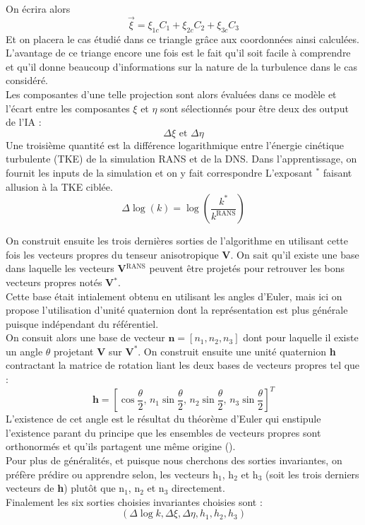 \documentclass[a4paper,12pt]{report}
\newcommand{\bepar}[1]{
	\left( #1 \right)  
}
\newcommand{\becro}[1]{
	\left[ #1 \right]  
}
\numberwithin{equation}{section} %
\begin{document}
On écrira alors $$\vec{\xi} = \xi_{1c}C_1 + \xi_{2c}C_2 + \xi_{3c}C_3$$
Et on placera le cas étudié dans ce triangle grâce aux coordonnées ainsi calculées. L'avantage de ce triange encore une fois est le fait qu'il soit facile à comprendre et qu'il donne beaucoup d'informations sur la nature de la turbulence dans le cas considéré.\\
Les composantes d'une telle projection sont alors évaluées dans ce modèle et l'écart entre les composantes $\xi$ et $\eta$ sont sélectionnés pour être deux des output de l'IA : $$\Delta \xi\text{ et }\Delta \eta$$
  Une troisième quantité est la différence logarithmique entre l'énergie cinétique turbulente (TKE) de la simulation RANS et de la DNS. Dans l'apprentissage, on fournit les inputs de la simulation et on y fait correspondre L'exposant $^*$ faisant allusion à la TKE ciblée. $$\Delta \log(k) = \log\bepar{\frac{k^*}{k^{\text{RANS}}}}$$ 
  
\noindent On construit ensuite les trois dernières sorties de l'algorithme en utilisant cette fois les vecteurs propres du tenseur anisotropique \textbf{V}. On sait qu'il existe une base dans laquelle les vecteurs \textbf{V}$^{\text{RANS}}$ peuvent être projetés pour retrouver les bons vecteurs propres notés \textbf{V}$^*$.\\
Cette base était intialement obtenu en utilisant les angles d'Euler, mais ici on propose l'utilisation d'unité quaternion  dont la représentation est plus générale puisque indépendant du référentiel.\\
On consuit alors une base de vecteur $\textbf{n} = \becro{n_1,n_2,n_3}$ dont pour laquelle il existe un angle $\theta$ projetant $\textbf{V}$ sur $\textbf{V}^*$. On construit ensuite une unité quaternion \textbf{h} contractant la matrice de rotation liant les deux bases de vecteurs propres tel que :
\begin{equation*}
 \textbf{h} = \becro{\cos \frac{\theta}{2},\, n_1\sin\frac{\theta}{2}, \, n_2\sin\frac{\theta}{2}, \, n_3\sin\frac{\theta}{2}}^T  
\end{equation*}   
L'existence de cet angle est le résultat du théorème d'Euler qui enstipule l'existence parant du principe que les ensembles de vecteurs propres sont orthonormés et qu'ils partagent une même origine (\cite{wang2017physics}).\\
Pour plus de généralités, et puisque nous cherchons des sorties invariantes, on préfère prédire ou apprendre selon, les vecteurs h$_1$, h$_2$ et h$_3$ (soit les trois derniers vecteurs de \textbf{h}) plutôt que n$_1$, n$_2$ et n$_3$ directement.\\
Finalement les six sorties choisies invariantes choisies sont :
\begin{equation*}
\bepar{\Delta \log k, \Delta \xi, \Delta \eta, h_1, h_2, h_3}
\end{equation*}
\end{document}

